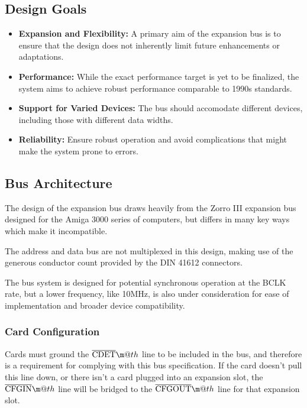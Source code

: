 \documentclass{article}
\makeatletter
\newcommand*{\textoverline}[1]{$\overline{\hbox{#1}}\m@th$}
\makeatother
\begin{document}
\subsection{Design Goals}

\begin{itemize}
	\item \textbf{Expansion and Flexibility:} A primary aim of the expansion
	bus is to ensure that the design does not inherently limit future
	enhancements or adaptations.

	\item \textbf{Performance:} While the exact performance target is yet to
	be finalized, the system aims to achieve robust performance comparable
	to 1990s standards.

	\item \textbf{Support for Varied Devices:} The bus should accomodate
	different devices, including those with different data widths.

	\item \textbf{Reliability:} Ensure robust operation and avoid
	complications that might make the system prone to errors.
\end{itemize}

\subsection{Bus Architecture}

The design of the expansion bus draws heavily from the Zorro III expansion bus
designed for the Amiga 3000 series of computers, but differs in many key ways
which make it incompatible.

The address and data bus are not multiplexed in this design, making use of the
generous conductor count provided by the DIN 41612 connectors.

The bus system is designed for potential synchronous operation at the BCLK rate,
but a lower frequency, like 10MHz, is also under consideration for ease of
implementation and broader device compatibility.

\subsubsection{Card Configuration}

Cards must ground the \textoverline{CDET} line to be included in the
bus, and therefore is a requirement for complying with this bus specification.
If the card doesn't pull this line down, or there isn't a card plugged into an
expansion slot, the \textoverline{CFGIN} line will be bridged to the
\textoverline{CFGOUT} line for that expansion slot.
\end{document}
